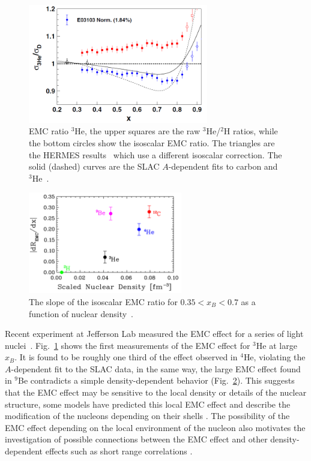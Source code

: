 \begin{figure}[tb]
  \begin{center}
     \includegraphics[angle=0, width=0.7\textwidth]{./fig-intro/seely_3he}
    \caption{EMC ratio $^3$He, the upper squares are the raw $^3$He/$^2$H ratios, while the bottom circles show the isoscalar EMC ratio. The triangles are the HERMES results~\cite{Ackerstaff2000} which use a different isoscalar correction. The solid (dashed) curves are the SLAC $A$-dependent fits to carbon and $^3$He~\cite{Seely2009}.}
    \label{fig:He3_hallc}
  \end{center}
\end{figure}

\begin{figure}[tb]
  \begin{center}
    \includegraphics[angle=0, width=0.6\textwidth]{./fig-intro/seely_ratio}
    \caption{The slope of the isoscalar EMC ratio for $0.35<x_B<0.7$ as a function of nuclear density~\cite{Seely2009}.}
    \label{fig:ratio_hallc}
  \end{center}
\end{figure}

Recent experiment at Jefferson Lab measured the EMC effect for a series of light nuclei~\cite{Seely2009}. Fig.~\ref{fig:He3_hallc} shows the first measurements of the EMC effect for $^3$He at large $x_B$. It is found to be roughly one third of the effect observed in $^4$He, violating the $A$-dependent fit to the SLAC data, in the same way, the large EMC effect found in $^9$Be contradicts a simple density-dependent behavior (Fig.~\ref{fig:ratio_hallc}). This suggests that the EMC effect may be sensitive to the local density or details of the nuclear structure, some models have predicted this local EMC effect and describe the modification of the nucleons depending on their shells \cite{Kumano1990,ciofiliuti1991,CiofidegliAtti1999}. The possibility of the EMC effect depending on the local environment of the nucleon also motivates the investigation of possible connections between the EMC effect and other density-dependent effects such as short range correlations \cite{Higinbotham:2010ye, Weinstein:2010rt}.

